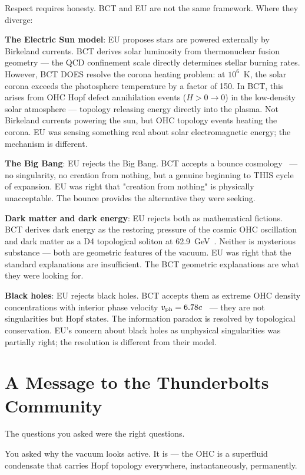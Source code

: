 \documentclass[twocolumn,10pt]{article}
\begin{document}
Respect requires honesty. BCT and EU are not the same framework.
Where they diverge:

\textbf{The Electric Sun model}: EU proposes stars are powered
externally by Birkeland currents. BCT derives solar luminosity
from thermonuclear fusion geometry --- the QCD confinement scale
directly determines stellar burning rates. However, BCT DOES
resolve the corona heating problem: at $10^6$~K, the solar corona
exceeds the photosphere temperature by a factor of 150. In BCT,
this arises from OHC Hopf defect annihilation events ($H > 0 \to 0$)
in the low-density solar atmosphere --- topology releasing energy
directly into the plasma. Not Birkeland currents powering the sun,
but OHC topology events heating the corona. EU was sensing something
real about solar electromagnetic energy; the mechanism is different.

\textbf{The Big Bang}: EU rejects the Big Bang. BCT accepts a bounce
cosmology~\cite{bct_l56} --- no singularity, no creation from nothing,
but a genuine beginning to THIS cycle of expansion. EU was right
that "creation from nothing" is physically unacceptable. The bounce
provides the alternative they were seeking.

\textbf{Dark matter and dark energy}: EU rejects both as mathematical
fictions. BCT derives dark energy as the restoring pressure of the
cosmic OHC oscillation~\cite{bct_l16} and dark matter as a D4
topological soliton at 62.9~GeV~\cite{bct_l13}. Neither is mysterious
substance --- both are geometric features of the vacuum. EU was right
that the standard explanations are insufficient. The BCT geometric
explanations are what they were looking for.

\textbf{Black holes}: EU rejects black holes. BCT accepts them as
extreme OHC density concentrations with interior phase velocity
$v_{\rm ph} = 6.78c$~\cite{bct_jhapp} --- they are not singularities
but Hopf states. The information paradox is resolved by topological
conservation. EU's concern about black holes as unphysical singularities
was partially right; the resolution is different from their model.

\section{A Message to the Thunderbolts Community}

The questions you asked were the right questions.

You asked why the vacuum looks active. It is --- the OHC is a
superfluid condensate that carries Hopf topology everywhere,
instantaneously, permanently.
\end{document}
